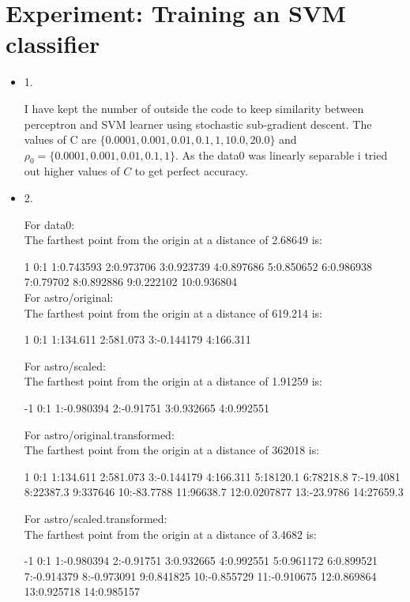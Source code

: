 \documentclass[12pt]{exam}
\begin{document}
\section{Experiment: Training an SVM classifier}
\begin{itemize}
\item[] 1.
\begin{solution}
I have kept the number of outside the code to keep similarity between perceptron and SVM learner using stochastic sub-gradient descent. 
The values of C are $\{0.0001,0.001,0.01,0.1,1,10.0,20.0\}$ and $\rho_0 = \{0.0001,0.001,0.01,0.1,1\}$. As the data0 was linearly separable i tried out higher values of $C$ to get perfect accuracy.
\end{solution}
\item[] 2.
\begin{solution}
For data0:\\
The farthest point from the origin at a distance of 2.68649 is:

1 0:1 1:0.743593 2:0.973706 3:0.923739 4:0.897686 5:0.850652 6:0.986938 7:0.79702 8:0.892886 9:0.222102 10:0.936804\\

For astro/original:\\
The farthest point from the origin at a distance of 619.214 is:

1 0:1 1:134.611 2:581.073 3:-0.144179 4:166.311

For astro/scaled:\\
The farthest point from the origin at a distance of 1.91259 is:

-1 0:1 1:-0.980394 2:-0.91751 3:0.932665 4:0.992551

For astro/original.transformed:\\
The farthest point from the origin at a distance of 362018 is:

1 0:1 1:134.611 2:581.073 3:-0.144179 4:166.311 5:18120.1 6:78218.8 7:-19.4081 8:22387.3 9:337646 10:-83.7788 11:96638.7 12:0.0207877 13:-23.9786 14:27659.3

For astro/scaled.transformed:\\
The farthest point from the origin at a distance of 3.4682 is:

-1 0:1 1:-0.980394 2:-0.91751 3:0.932665 4:0.992551 5:0.961172 6:0.899521 7:-0.914379 8:-0.973091 9:0.841825 10:-0.855729 11:-0.910675 12:0.869864 13:0.925718 14:0.985157

\end{solution}


\end{itemize}
\end{document}
